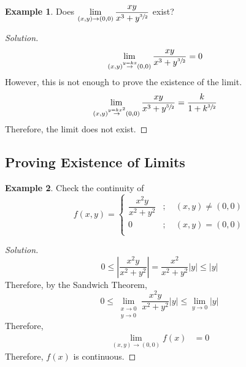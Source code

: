 \documentclass[fleqn, 12pt]{article}
\theoremstyle{definition}
\newtheorem{example}{Example}
\theoremstyle{theorem}
\newenvironment{solution}
{\begin{proof}[Solution]\let\qed\relax}
	{\end{proof}}
\begin{document}
\begin{example}
	Does $\lim\limits_{(x,y) \to (0,0)} \dfrac{x y}{x^3 + y^{\sfrac{3}{2}}}$ exist?
\end{example}

\begin{solution}
	\begin{align*}
		\lim\limits_{(x,y) \stackrel{y = kx}{\to} (0,0)} \dfrac{x y}{x^3 + y^{\sfrac{3}{2}}} &= 0
	\end{align*}
	However, this is not enough to prove the existence of the limit.
	\begin{align*}
		\lim\limits_{(x,y) \stackrel{y = k x^2}{\to} (0,0)} \dfrac{x y}{x^3 + y^{\sfrac{3}{2}}} &= \dfrac{k}{1 + k^{\sfrac{3}{2}}}
	\end{align*}
	Therefore, the limit does not exist.
\end{solution}

\subsection{Proving Existence of Limits}

\begin{example}
	Check the continuity of 
	\begin{equation*}
		f(x,y) =
			\begin{cases}
				\dfrac{x^2 y}{x^2+ y^2} &;\quad (x,y) \neq (0,0)\\
				0 &;\quad (x,y) = (0,0)\\
			\end{cases}
	\end{equation*}
\end{example}

\begin{solution}
	\begin{equation*}
		0 \leq \left\lvert \dfrac{x^2 y}{x^2 + y^2} \right\rvert = \dfrac{x^2}{x^2 + y^2} |y| \leq |y|
	\end{equation*}
	Therefore, by the Sandwich Theorem,
	\begin{equation*}
		0 \leq \lim\limits_{\substack{
			x \to 0\\
			y \to 0}} \dfrac{x^2 y}{x^2 + y^2} |y| \leq \lim\limits_{y \to 0} |y|
	\end{equation*}
	Therefore,
	\begin{align*}
		\lim\limits_{(x,y) \to (0,0)} f(x) &= 0
	\end{align*}
	Therefore, $f(x)$ is continuous.
\end{solution}
\end{document}
